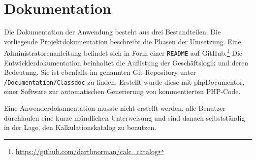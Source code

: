 \section{Dokumentation}
\label{sec:Dokumentation}
Die Dokumentation der Anwendung besteht aus drei Bestandteilen. Die vorliegende
Projektdokumentation beschreibt die Phasen der Umsetzung. Eine
Administratorenanleitung befindet sich in Form einer \texttt{README} auf
GitHub.\footnote{\url{https://github.com/darthnorman/calc_catalog}}
Die Entwicklerdokumentation beinhaltet die Auflistung der Geschäftslogik und
deren Bedeutung. Sie ist ebenfalls im genannten Git-Repository unter
\texttt{/Documentation/Classdoc} zu finden. Erstellt wurde diese mit
phpDocumentor\citet{phpDoc}, einer Software zur automatischen Generierung von
kommentierten \acs{PHP}-Code. 

Eine Anwenderdokumentation musste nicht erstellt werden, alle Benutzer
durchlaufen eine kurze mündlichen Unterweisung und sind danach selbstständig
in der Lage, den Kalkulationskatalog zu benutzen.
